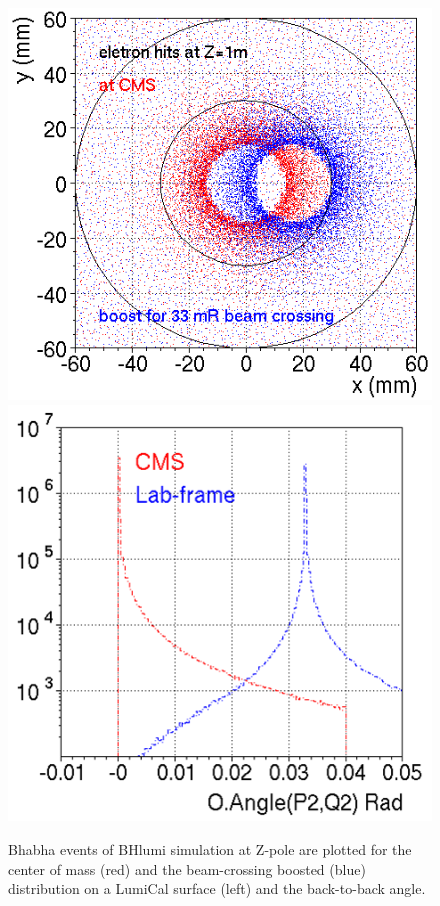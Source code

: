 \begin{figure}[p!] 
	
	\centering
	\includegraphics[width=.35\linewidth]{Figures/MDI/BH_rphi.png}  
	\hspace{.2cm}
	\includegraphics[width=.35\linewidth]{Figures/MDI/BH_b2b.png} 
	\caption{ Bhabha events of
		BHlumi simulation at Z-pole are plotted for the 
		center of mass (red) and the beam-crossing boosted (blue)
		distribution on a LumiCal surface (left) and the back-to-back angle.
		\label{fig:Bhabha_33mrad_offset} }
	

\end{figure}
